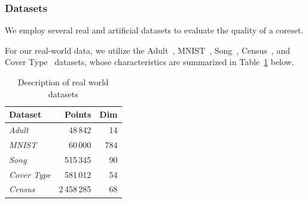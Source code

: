 \subsubsection{Datasets}

We employ several real and artificial datasets to evaluate the quality of a coreset. 

For our real-world data, we utilize the Adult~\cite{Dua:2019}, MNIST~\cite{mnist}, Song~\cite{song}, Census~\cite{census}, and Cover Type~\cite{covtype}
datasets, whose characteristics are summarized in Table~\ref{tbl:datasets} below.

\begin{table}[htbp]
    \centering
    \begin{tabular}{lrr}
        Dataset & Points & Dim \\
        \hline
        \emph{Adult} & 48\,842 & 14 \\
        \emph{MNIST} & 60\,000 & 784 \\
        \emph{Song} & 515\,345 & 90 \\
        \emph{Cover Type} & 581\,012 & 54 \\
        \emph{Census} & 2\,458\,285 & 68
    \end{tabular}
    \caption{Description of real world datasets}
        \label{tbl:datasets}
\end{table}


